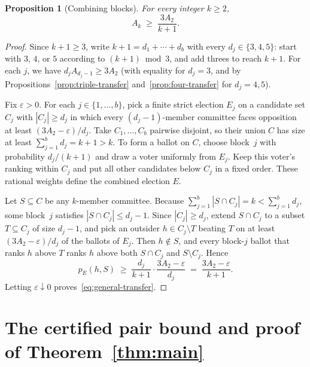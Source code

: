 \documentclass[11pt,letterpaper]{article}
\theoremstyle{cleanthm}
\newtheorem{proposition}[lemma]{Proposition}
\begin{document}
\begin{proposition}[Combining blocks]\label{prop:blocks}
For every integer \(k\ge 2\),
\begin{equation}\label{eq:general-transfer}
 A_k \;\ge\; \frac{3A_2}{k+1}.
\end{equation}
\end{proposition}

\begin{proof}
Since \(k+1\ge 3\), write \(k+1=d_1+\cdots+d_b\) with every \(d_j\in\{3,4,5\}\): start with \(3\),
\(4\), or \(5\) according to \((k+1)\bmod 3\), and add threes to reach \(k+1\). For each \(j\), we
have \(d_j A_{d_j-1}\ge 3A_2\) (with equality for \(d_j=3\), and by
Propositions~\ref{prop:triple-transfer} and~\ref{prop:four-transfer} for \(d_j=4,5\)).

Fix \(\varepsilon>0\). For each \(j\in\{1,\ldots,b\}\), pick a finite strict election \(E_j\) on a
candidate set \(C_j\) with \(|C_j|\ge d_j\) in which every \((d_j-1)\)-member committee faces
opposition at least \((3A_2-\varepsilon)/d_j\). Take \(C_1,\ldots,C_b\) pairwise disjoint, so
their union \(C\) has size at least \(\sum_{j=1}^b d_j=k+1>k\). To form a ballot on \(C\), choose
block~\(j\) with probability \(d_j/(k+1)\) and draw a voter uniformly from \(E_j\). Keep this
voter's ranking within \(C_j\) and put all other candidates below \(C_j\) in a fixed order. These
rational weights define the combined election \(E\).

Let \(S\subseteq C\) be any \(k\)-member committee. Because
\(\sum_{j=1}^b |S\cap C_j|=k<\sum_{j=1}^b d_j\), some block~\(j\) satisfies
\(|S\cap C_j|\le d_j-1\). Since \(|C_j|\ge d_j\), extend \(S\cap C_j\) to a subset
\(T\subseteq C_j\) of size \(d_j-1\), and pick an outsider \(h\in C_j\setminus T\) beating \(T\)
on at least \((3A_2-\varepsilon)/d_j\) of the ballots of \(E_j\). Then \(h\notin S\), and every
block-\(j\) ballot that ranks \(h\) above \(T\) ranks \(h\) above both \(S\cap C_j\) and
\(S\setminus C_j\). Hence
\[
 p_E(h,S) \;\ge\; \frac{d_j}{k+1}\cdot\frac{3A_2-\varepsilon}{d_j} \;=\;
 \frac{3A_2-\varepsilon}{k+1}.
\]
Letting \(\varepsilon\downarrow 0\) proves~\eqref{eq:general-transfer}.
\end{proof}


\newpage
\section[The certified pair bound]{The certified pair bound and proof of Theorem~\ref{thm:main}}\label{sec:pair-z}
\end{document}

